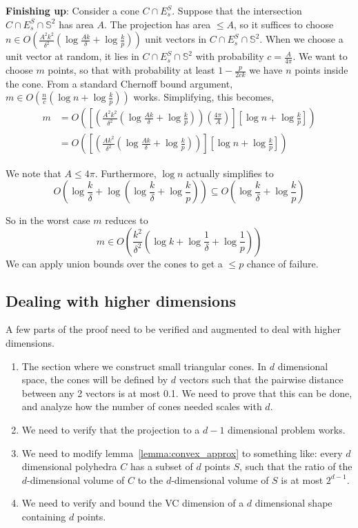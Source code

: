 \documentclass[12pt]{article}
\theoremstyle{definition}
\theoremstyle{lemma}
\theoremstyle{theorem}
\begin{document}
\textbf{Finishing up}: Consider a cone $C \cap E^S_s$. Suppose that the intersection $C \cap E^S_s \cap \mathbb {S}^2$ has area $A$. The projection has area $\leq A$, so it suffices to choose $n \in O(\frac{A^2k^2}{\delta^2} (\log{\frac{Ak}{\delta}} + \log{\frac{k}{p}}))$ unit vectors in $C \cap E^S_s \cap \mathbb {S}^2$. When we choose a unit vector at random, it lies in $C \cap E^S_s \cap \mathbb {S}^2$ with probability $c = \frac{A}{4\pi}$. We want to choose $m$ points, so that with probability at least $1-\frac{p}{2ck}$ we have $n$ points inside the cone. From a standard Chernoff bound argument, $m \in O(\frac{n}{c}(\log{n} + \log{\frac{k}{p}} ))$ works. Simplifying, this becomes,
\begin{align*}
m &= O\left(\left[\left(\frac{A^2k^2}{\delta^2} \left(\log{\frac{Ak}{\delta}} + \log{\frac{k}{p}}\right)\right)\left(\frac{4\pi}{A}\right)\right]\left[ \log{n} + \log{\frac{k}{p}} \right]\right) \\
&= O\left( \left[\left(\frac{Ak^2}{\delta^2} \left(\log{\frac{Ak}{\delta}} + \log{\frac{k}{p}}\right)\right)\right]\left[ \log{n} + \log{\frac{k}{p}} \right] \right)
\end{align*}

We note that $A \leq 4\pi$. Furthermore, $\log{n}$ actually simplifies to
\[ O(\log{\frac{k}{\delta}} + \log(\log{\frac{k}{\delta}} + \log{\frac{k}{p}})) \subseteq O(\log{\frac{k}{\delta}} + \log{\frac{k}{p}}) \]

So in the worst case $m$ reduces to
\[ m \in O\left(\frac{k^2}{\delta^2}\left(\log{k} + \log{\frac{1}{\delta} + \log{\frac{1}{p}} }\right)\right) \]
We can apply union bounds over the cones to get a $\leq p$ chance of failure.

\subsection{Dealing with higher dimensions}

A few parts of the proof need to be verified and augmented to deal with higher dimensions.
\begin{enumerate}
\item The section where we construct small triangular cones. In $d$ dimensional space, the cones will be defined by $d$ vectors such that the pairwise distance between any 2 vectors is at most 0.1. We need to prove that this can be done, and analyze how the number of cones needed scales with $d$.
\item We need to verify that the projection to a $d-1$ dimensional problem works.
\item We need to modify lemma~\ref{lemma:convex_approx} to something like: every $d$ dimensional polyhedra $C$ has a subset of $d$ points $S$, such that the ratio of the $d$-dimensional volume of $C$ to the $d$-dimensional volume of $S$ is at most $2^{d-1}$.
\item We need to verify and bound the VC dimension of a $d$ dimensional shape containing $d$ points.
\end{enumerate}

\end{document}
